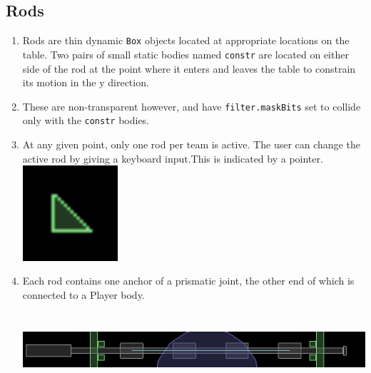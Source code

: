 \documentclass{article}
\begin{document}
\subsection{Rods}
\begin{enumerate}
\item Rods are thin dynamic \texttt{Box} objects located at appropriate locations on the table. Two pairs of small static bodies named \texttt{constr} are located on either side of the rod at the point where it enters and leaves the table to constrain its motion in the y direction.\\
\item These are non-transparent however, and have \texttt{filter.maskBits} set to collide only with the \texttt{constr} bodies.\\
\item At any given point, only one rod per team is active. The user can change the active rod by giving a keyboard input.This is indicated by a pointer.\\
\includegraphics[width=100pt,height=100pt]{Pointer}
\item Each rod contains one anchor of a prismatic joint, the other end of which is connected to a Player body.\\
\includegraphics[width=500pt,height=100pt]{Rod}
\end{enumerate}
\end{document}
